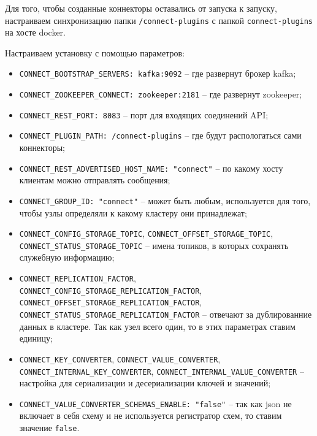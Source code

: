 Для того, чтобы созданные коннекторы оставались от запуска к запуску,
настраиваем синхронизацию папки \verb|/connect-plugins| с папкой
\verb|connect-plugins| на хосте docker.

Настраиваем установку с помощью параметров:
\begin{itemize}
    \item \verb|CONNECT_BOOTSTRAP_SERVERS: kafka:9092| -- где развернут брокер kafka;
    \item \verb|CONNECT_ZOOKEEPER_CONNECT: zookeeper:2181| -- где развернут zookeeper;
    \item \verb|CONNECT_REST_PORT: 8083| -- порт для входящих соединений API;
    \item \verb|CONNECT_PLUGIN_PATH: /connect-plugins| -- где будут
        распологаться сами коннекторы; 
    \item \verb|CONNECT_REST_ADVERTISED_HOST_NAME: "connect"| -- по какому хосту
        клиентам можно отправлять сообщения;
    \item \verb|CONNECT_GROUP_ID: "connect"| -- может быть любым, используется
        для того, чтобы узлы определяли к какому кластеру они принадлежат;
    \item \verb|CONNECT_CONFIG_STORAGE_TOPIC|,
        \verb|CONNECT_OFFSET_STORAGE_TOPIC|, \verb|CONNECT_STATUS_STORAGE_TOPIC|
        -- имена топиков, в которых сохранять служебную информацию;
    \item \verb|CONNECT_REPLICATION_FACTOR|,
        \verb|CONNECT_CONFIG_STORAGE_REPLICATION_FACTOR|,
        \verb|CONNECT_OFFSET_STORAGE_REPLICATION_FACTOR|,
        \verb|CONNECT_STATUS_STORAGE_REPLICATION_FACTOR| -- отвечают за
        дублированние данных в кластере. Так как узел всего один, то в этих
        параметрах ставим единицу;
    \item \verb|CONNECT_KEY_CONVERTER|, \verb|CONNECT_VALUE_CONVERTER|,
        \verb|CONNECT_INTERNAL_KEY_CONVERTER|,
        \verb|CONNECT_INTERNAL_VALUE_CONVERTER| -- настройка для сериализации и
        десериализации ключей и значений;
    \item \verb|CONNECT_VALUE_CONVERTER_SCHEMAS_ENABLE: "false"| -- так как json
        не включает в себя схему и не используется регистратор схем, то ставим
        значение \verb|false|.
\end{itemize}

